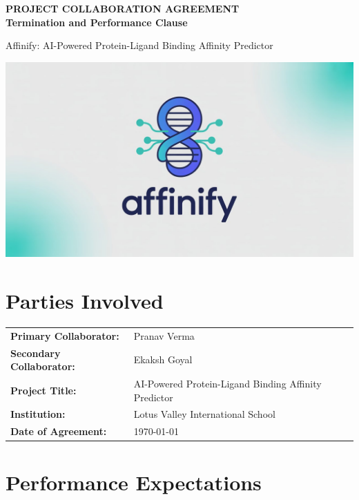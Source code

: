 \documentclass[12pt,a4paper]{article}
\begin{document}
\begin{center}
{\Large\bfseries PROJECT COLLABORATION AGREEMENT}\\
{\large\bfseries Termination and Performance Clause}
\vspace{0.5cm}

{\normalsize Affinify: AI-Powered Protein-Ligand Binding Affinity Predictor}\\
\end{center}

\vspace{1cm}

\includegraphics[width=1\textwidth]{../../Logo/logo-banner.jpeg}

\vspace{1cm}

\section*{Parties Involved}

\begin{tabular}{ll}
\textbf{Primary Collaborator:} & Pranav Verma \\
\textbf{Secondary Collaborator:} & Ekaksh Goyal \\
\textbf{Project Title:} & AI-Powered Protein-Ligand Binding Affinity Predictor \\
\textbf{Institution:} & Lotus Valley International School \\
\textbf{Date of Agreement:} & \today
\end{tabular}

\vspace{1cm}

\section*{Performance Expectations}
\end{document}

